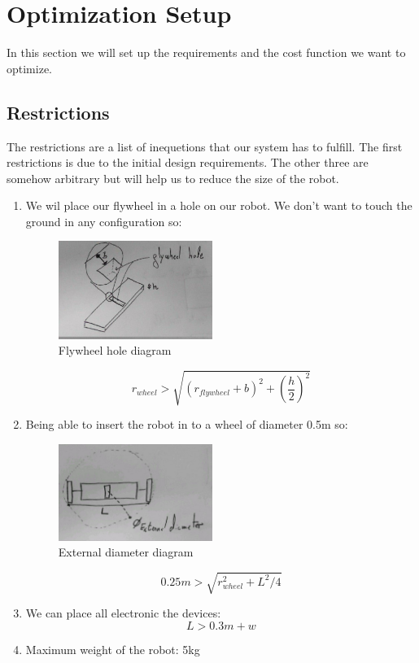 \section{Optimization Setup}
In this section we will set up the requirements and the cost function we want to optimize.

\subsection{Restrictions}
The restrictions are a list of inequetions that our system has to fulfill.
The first restrictions is due to the initial design requirements. The other three are 
somehow arbitrary but will help us to reduce the size of the robot.
\begin{enumerate}
\item We wil place our flywheel in a hole on our robot. We don't want to touch the ground
in any configuration so:
\begin{figure}[ht]
	\centering
	\includegraphics[width=5cm]{img/flywheel_hole.jpg}
	\caption{Flywheel hole diagram}
	\label{fig:Flywheel hole diagram}
\end{figure}
\[r_{wheel}> \sqrt{(r_{flywheel} + b)^2+(\frac{h}{2})^2}\]
\item Being able  to insert the robot in to a wheel of diameter 0.5m so:
\begin{figure}[ht]
	\centering
	\includegraphics[width=5cm]{img/external_diameter.jpg}
	\caption{External diameter diagram}
	\label{fig:External diameter diagram}
\end{figure}
\[0.25 m > \sqrt{r_{wheel}^2 + L^2/4}\]
\item We can place all electronic the devices:
\[L > 0.3m + w \]
\item Maximum weight of the robot: 5kg
\end{enumerate}

